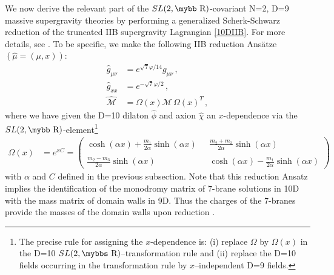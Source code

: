 \documentclass[12pt,a4paper]{article}
\def\bb#1{\hbox{\mybb#1}}
\def\bbs#1{\hbox{\mybbs#1}}
\begin{document}
We now derive the relevant part of the $SL(2,\bb{R})$-covariant
N=2, D=9 massive supergravity theories by performing a generalized
Scherk-Schwarz reduction of the truncated IIB supergravity
Lagrangian \eqref{10DIIB}. For more details, see
\cite{Meessen:1998qm,Gheerardyn:2001jj}. To be specific, we make
the following IIB reduction Ans\"atze $(\hat{\mu} = (\mu,x))$:
\begin{equation}
\begin{aligned}
  \hat{g}_{\mu\nu} & = e^{\sqrt{7} \varphi /14} g_{\mu\nu}\, , \\
  \hat{g}_{xx} & = e^{-\sqrt{7} \varphi /2}\, ,  \\
  \hat{\mathcal{M}} & = \Omega(x) \mathcal{M} \, \Omega(x)^T \,,
\end{aligned}
\label{redIIBto9}
\end{equation}
where we have given the D=10 dilaton $\hat\phi$ and axion
$\hat\chi$ an $x$-dependence via the
$SL(2,\bb{R})$-element\footnote{The precise rule for assigning the
$x$-dependence is: (i) replace $\Omega$ by $\Omega(x)$ in the D=10
$SL(2,\bbs{R})$--transformation rule and (ii) replace the D=10
fields occurring in the transformation rule by $x$--independent
D=9 fields.}
\begin{align}
\Omega (x)  & = e^{x C} = \left(
    \begin{array}{cc} \cosh(\alpha x) + \tfrac{m_1}{2\alpha} \sinh(\alpha x) &
     \ \ \ \tfrac{m_2+m_3}{2 \alpha} \sinh(\alpha x) \\
        &\\
     \tfrac{m_2-m_3}{2 \alpha} \sinh(\alpha x) &
     \ \ \ \cosh(\alpha x) - \tfrac{m_1}{2\alpha} \sinh(\alpha x) \end{array}
    \right)
\label{redtransf}
\end{align}
with $\alpha$ and $C$ defined in the previous subsection.
Note that this reduction Ansatz implies the identification
of the monodromy matrix of 7-brane solutions in 10D with the mass
matrix of domain walls in 9D.
Thus the charges of the 7-branes
provide the masses of the domain walls upon reduction \cite{Meessen:1998qm}.
\end{document}
